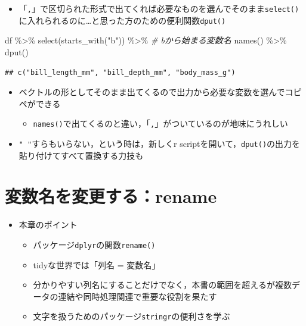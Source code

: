 \documentclass[
  xelatex,ja=standard, b5paper]{bxjsbook}
\newenvironment{Shaded}{\begin{snugshade}}{\end{snugshade}}
\newcommand{\CommentTok}[1]{\textcolor[rgb]{0.56,0.35,0.01}{\textit{#1}}}
\newcommand{\FunctionTok}[1]{\textcolor[rgb]{0.00,0.00,0.00}{#1}}
\newcommand{\NormalTok}[1]{#1}
\newcommand{\SpecialCharTok}[1]{\textcolor[rgb]{0.00,0.00,0.00}{#1}}
\newcommand{\StringTok}[1]{\textcolor[rgb]{0.31,0.60,0.02}{#1}}
\providecommand{\tightlist}{%
  \setlength{\itemsep}{0pt}\setlength{\parskip}{0pt}}
\begin{document}
\begin{itemize}
\tightlist
\item
  「\texttt{,}」で区切られた形式で出てくれば必要なものを選んでそのまま\texttt{select()}に入れられるのに\ldots と思った方のための便利関数\texttt{dput()}
\end{itemize}

\begin{Shaded}
\begin{Highlighting}[]
\NormalTok{df }\SpecialCharTok{\%\textgreater{}\%} 
  \FunctionTok{select}\NormalTok{(}\FunctionTok{starts\_with}\NormalTok{(}\StringTok{"b"}\NormalTok{)) }\SpecialCharTok{\%\textgreater{}\%} \CommentTok{\# bから始まる変数名}
  \FunctionTok{names}\NormalTok{() }\SpecialCharTok{\%\textgreater{}\%} 
  \FunctionTok{dput}\NormalTok{()}
\end{Highlighting}
\end{Shaded}

\begin{verbatim}
## c("bill_length_mm", "bill_depth_mm", "body_mass_g")
\end{verbatim}

\begin{itemize}
\tightlist
\item
  ベクトルの形としてそのまま出てくるので出力から必要な変数を選んでコピペができる

  \begin{itemize}
  \tightlist
  \item
    \texttt{names()}で出てくるのと違い，「\texttt{,}」がついているのが地味にうれしい
  \end{itemize}
\item
  \texttt{"\ "}すらもいらない，という時は，新しくr scriptを開いて，\texttt{dput()}の出力を貼り付けてすべて置換する力技も
\end{itemize}

\hypertarget{rename}{%
\chapter{変数名を変更する：rename}\label{rename}}

\begin{itemize}
\tightlist
\item
  本章のポイント

  \begin{itemize}
  \tightlist
  \item
    パッケージ\texttt{dplyr}の関数\texttt{rename()}\\
  \item
    tidyな世界では「列名 = 変数名」\\
  \item
    分かりやすい列名にすることだけでなく，本書の範囲を超えるが複数データの連結や同時処理関連で重要な役割を果たす\\
  \item
    文字を扱うためのパッケージ\texttt{stringr}の便利さを学ぶ
  \end{itemize}
\end{itemize}
\end{document}

